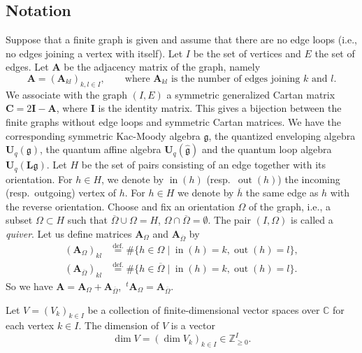 \documentclass[12pt]{amsart}
\def\Bbb{\mathbb}
\def\frak{\mathfrak}
\theoremstyle{definition}
\theoremstyle{remark}
\numberwithin{equation}{subsection}
\newcommand{\lsp}[2]{\,{}^{#1}{#2}}
\newcommand{\defeq}{\overset{\operatorname{\scriptstyle def.}}{=}}
\newcommand{\C}{{\Bbb C}}
\newcommand{\vin}{\operatorname{in}} %
\newcommand{\vout}{\operatorname{out}} %
\newcommand{\bC}{{\mathbf C}} %
\newcommand{\bA}{{\mathbf A}} %
\newcommand{\bI}{{\mathbf I}} %
\newcommand{\Uq}{{\mathbf U}_q(\mathfrak g)} %
\newcommand{\Ua}{{\mathbf U}_q(\widehat{\mathfrak g})} %
\newcommand{\Ul}{{\mathbf U}_q({\mathbf L}{\mathfrak g})} %
\begin{document}
\subsection{Notation}
%
Suppose that a finite graph is given and assume that there are no edge
loops (i.e., no edges joining a vertex with itself).
Let $I$ be the set of vertices and $E$ the set of edges.
%
Let $\bA$ be the adjacency matrix of the graph, namely
\begin{equation*}
   \bA = (\bA_{kl})_{k,l\in I}, \qquad
   \text{where $\bA_{kl}$ is the number of edges joining $k$ and $l$}.
\end{equation*}
We associate with the graph $(I, E)$ a symmetric generalized Cartan matrix 
$\bC = 2\bI - \bA$, where $\bI$ is the identity matrix.
This gives a bijection between the finite graphs without edge loops and
symmetric Cartan matrices.
We have the corresponding symmetric Kac-Moody algebra $\frak g$, the
quantized enveloping algebra $\Uq$, the quantum affine algebra $\Ua$
and the quantum loop algebra $\Ul$.
%
Let $H$ be the set of pairs consisting of an edge together with its
orientation. For $h\in H$, we denote by $\vin(h)$ (resp.\ $\vout(h)$)
the incoming (resp.\ outgoing) vertex of $h$.
For $h\in H$ we denote by $\overline h$ the same edge as $h$ with the
reverse orientation.
%
Choose and fix an orientation $\Omega$ of the graph,
i.e., a subset $\Omega\subset H$ such that
$\overline\Omega\cup\Omega = H$, $\Omega\cap\overline\Omega = \emptyset$.
%
The pair $(I,\Omega)$ is called a {\it quiver}.
%
Let us define matrices $\bA_\Omega$ and $\bA_{\overline\Omega}$ by
\begin{equation}\label{eq:Aomega}
\begin{split}
   (\bA_\Omega)_{kl} 
   & \defeq \# \{ h\in \Omega \mid \vin(h) = k, \vout(h) = l\}, \\
   (\bA_{\overline\Omega})_{kl} 
   & \defeq \# \{ h\in \overline{\Omega} \mid \vin(h) = k, \vout(h) = l\}.
\end{split}
\end{equation}
So we have $\bA = \bA_\Omega + \bA_{\overline\Omega}$,
$\lsp{t}\bA_\Omega = \bA_{\overline\Omega}$.  

Let $V = (V_k)_{k\in I}$ be a collection of finite-dimensional vector
spaces over $\C$ for each vertex $k\in I$. 
The dimension of $V$ is a vector
\[
  \dim V = (\dim V_k)_{k\in I}\in \Bbb Z_{\ge 0}^I.
\]
\end{document}
